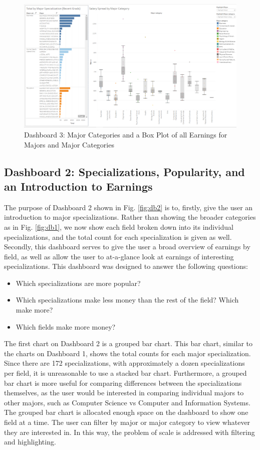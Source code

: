 \documentclass[sigchi]{acmart}
\begin{document}
  \begin{figure}[thpb]
  \includegraphics[width=1.0\textwidth]{DB3.png}
     \caption{Dashboard 3: Major Categories and a Box Plot of all Earnings for Majors and Major Categories}
         \label{fig:db3}
  \end{figure}

\subsection{Dashboard 2: Specializations, Popularity, and an Introduction to Earnings}
\label{sec:db2}

The purpose of Dashboard 2 shown in Fig. \ref{fig:db2} is to, firstly, give the user an introduction to major specializations. Rather than showing the broader categories as in Fig. \ref{fig:db1}, we now show each field broken down into its individual specializations, and the total count for each specialization is given as well. Secondly, this dashboard serves to give the user a broad overview of earnings by field, as well as allow the user to at-a-glance look at earnings of interesting specializations. This dashboard was designed to answer the following questions: 
\begin{itemize}
\item{Which specializations are more popular?}
\item{Which specializations make less money than the rest of the field?  Which make more?}
\item{Which fields make more money?}
\end{itemize}

The first chart on Dashboard 2 is a grouped bar chart. This bar chart, similar to the charts on Dashboard 1, shows the total counts for each major specialization. Since there are 172 specializations, with approximately a dozen specializations per field, it is unreasonable to use a stacked bar chart. Furthermore, a grouped bar chart is more useful for comparing differences between the specializations themselves, as the user would be interested in comparing individual majors to other majors, such as Computer Science vs Computer and Information Systems. The grouped bar chart is allocated enough space on the dashboard to show one field at a time. The user can filter by major or major category to view whatever they are interested in. In this way, the problem of scale is addressed with filtering and highlighting. 
\end{document}
